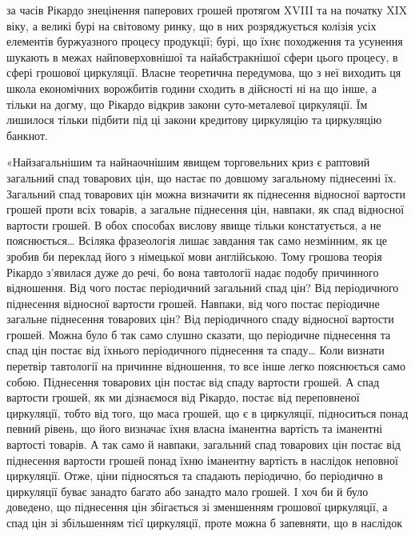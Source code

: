 \parcont{}  %
за часів Рікардо знецінення паперових грошей протягом XVIII та на початку
XIX віку, а великі бурі на світовому ринку, що в них розряджується колізія
усіх елементів буржуазного процесу продукції; бурі, що їхнє походження та усунення
шукають в межах найповерховнішої та найабстракнішої сфери цього процесу,
в сфері грошової циркуляції. Власне теоретична передумова, що з неї виходить
ця школа економічних ворожбитів години сходить в дійсності ні на що інше, а
тільки на догму, що Рікардо відкрив закони суто-металевої циркуляції. Їм лишилося
тільки підбити під ці закони кредитову циркуляцію та циркуляцію банкнот.

«Найзагальнішим та найнаочнішим явищем торговельних криз є раптовий
загальний спад товарових цін, що настає по довшому загальному піднесенні їх.
Загальний спад товарових цін можна визначити як піднесення відносної вартости
грошей проти всіх товарів, а загальне піднесення цін, навпаки, як спад
відносної вартости грошей. В обох способах вислову явище тільки констатується,
а не пояснюється\dots{} Всіляка фразеологія лишає завдання так само
незмінним, як це зробив би переклад його з німецької мови англійською. Тому
грошова теорія Рікардо з’явилася дуже до речі, бо вона тавтології надає подобу
причинного відношення. Від чого постає періодичний загальний спад цін? Від
періодичного піднесення відносної вартости грошей. Навпаки, від чого постає
періодичне загальне піднесення товарових цін? Від періодичного спаду відносної
вартости грошей. Можна було б так само слушно сказати, що періодичне піднесення
та спад цін постає від їхнього періодичного піднесення та спаду\dots{}
Коли визнати перетвір тавтології на причинне відношення, то все інше легко
пояснюється само собою. Піднесення товарових цін постає від спаду вартости
грошей. А спад вартости грошей, як ми дізнаємося від Рікардо, постає від переповненої
циркуляції, тобто від того, що маса грошей, що є в циркуляції, підноситься
понад певний рівень, що його визначає їхня власна іманентна вартість
та іманентні вартості товарів. А так само й навпаки, загальний спад товарових цін
постає від піднесення вартости грошей понад їхню іманентну вартість в наслідок
неповної циркуляції. Отже, ціни підносяться та спадають періодично, бо періодично
в циркуляції буває занадто багато або занадто мало грошей. І хоч би й було
доведено, що піднесення цін збігається зі зменшенням грошової циркуляції, а
спад цін зі збільшенням тієї циркуляції, проте можна б запевняти, що в наслідок
